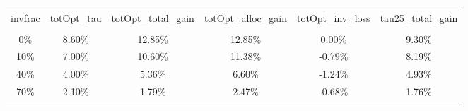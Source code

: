 
\begin{table}[!htbp] \centering 
  \caption{} 
  \label{} 
\begin{tabular}{@{\extracolsep{5pt}} cccccc} 
\\[-1.8ex]\hline 
\hline \\[-1.8ex] 
invfrac & totOpt\_tau & totOpt\_total\_gain & totOpt\_alloc\_gain & totOpt\_inv\_loss & tau25\_total\_gain \\ 
\hline \\[-1.8ex] 
0\% & 8.60\% & 12.85\% & 12.85\% &  0.00\% & 9.30\% \\ 
10\% & 7.00\% & 10.60\% & 11.38\% & -0.79\% & 8.19\% \\ 
40\% & 4.00\% &  5.36\% &  6.60\% & -1.24\% & 4.93\% \\ 
70\% & 2.10\% &  1.79\% &  2.47\% & -0.68\% & 1.76\% \\ 
\hline \\[-1.8ex] 
\end{tabular} 
\end{table} 
